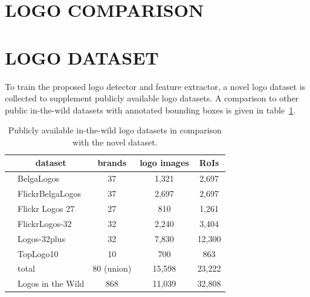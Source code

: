 \documentclass[a4paper,twoside]{article}
\newcommand{\vertboxs}[1]{\rotatebox{90}{\parbox{14mm}{\centering #1}}}
\newcommand{\vertboxt}[1]{\rotatebox{90}{\parbox{10mm}{\centering #1}}}
\begin{document}

\section{\uppercase{Logo Comparison}}


\section{\uppercase{Logo Dataset}}
\noindent To train the proposed logo detector and feature extractor, a novel logo dataset is collected to supplement publicly available logo datasets. A comparison to other public in-the-wild datasets with annotated bounding boxes is given in table~\ref{tab:logoDatasets}.
%
\begin{table}[t]
\centering
\caption{Publicly available in-the-wild logo datasets in comparison with the novel dataset.}
\label{tab:logoDatasets}
\begin{small}
\begin{tabular}{cl|ccc}
& \multicolumn{1}{c|}{\textbf{dataset}} & \textbf{brands} & \textbf{logo images} & \textbf{RoIs} \bigstrut[b]\\
\hline
\multirow{8}{*}{\vertboxs{public}} & BelgaLogos \cite{joly2009,letessier2012} & 37 & 1,321 & 2,697 \bigstrut[t] \\
& FlickrBelgaLogos \cite{letessier2012} & 37 & 2,697 & 2,697 \\
& Flickr Logos 27 \cite{kalantidis2011} & 27 & 810 & 1,261 \\
& FlickrLogos-32 \cite{romberg2011} & 32 & 2,240 & 3,404 \\
& Logos-32plus \cite{bianco2015,bianco2017} & 32 & 7,830 & 12,300 \\
& TopLogo10 \cite{su2016} & 10 & 700 & 863 \bigstrut[b] \\
\cline{2-5}
& total & 80 (union) & 15,598 & 23,222 \bigstrut \\
\hline
\begin{minipage}[c]{0.1cm}\vertboxt{new}\end{minipage} & Logos in the Wild & 868 & 11,039 & 32,808 \bigstrut[t]
\end{tabular}
\end{small}
\end{table}
\end{document}
